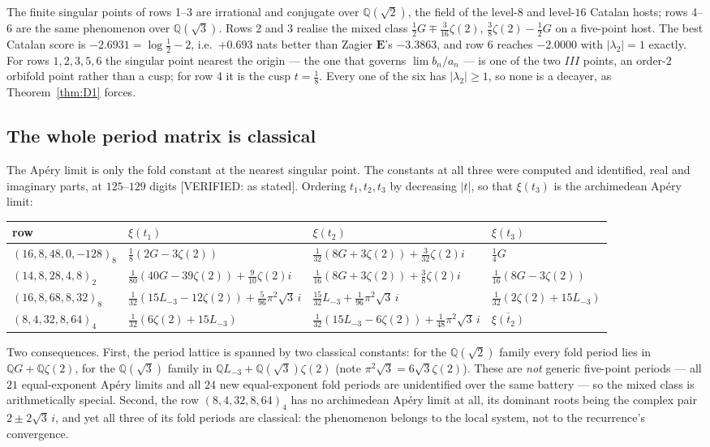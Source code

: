 \documentclass[11pt,reqno]{amsart}
\theoremstyle{plain}
\theoremstyle{definition}
\theoremstyle{remark}
\theoremstyle{plain}
\newcommand{\Q}{\mathbb{Q}}
\newcommand{\Verified}[1]{\textup{\textsf{[VERIFIED: #1]}}}
\begin{document}
The finite singular points of rows 1--3 are irrational and conjugate over
$\Q(\sqrt2)$, the field of the level-$8$ and level-$16$ Catalan hosts; rows 4--6
are the same phenomenon over $\Q(\sqrt3)$. Rows 2 and 3 realise the mixed class
$\tfrac12G\mp\tfrac3{16}\zeta(2)$, $\tfrac38\zeta(2)-\tfrac12G$ on a five-point
host. The best Catalan score is $-2.6931=\log\tfrac12-2$, i.e.\ $+0.693$ nats
better than Zagier $\mathbf E$'s $-3.3863$, and row 6 reaches $-2.0000$ with
$|\lambda_2|=1$ exactly. For rows $1,2,3,5,6$ the singular point nearest the
origin --- the one that governs $\lim b_n/a_n$ --- is one of the two $III$
points, an order-$2$ orbifold point rather than a cusp; for row 4 it is the cusp
$t=\tfrac18$. Every one of the six has $|\lambda_2|\ge1$, so none is a decayer,
as Theorem~\ref{thm:D1} forces.

\subsection{The whole period matrix is classical}\label{sec:matrix}
The Ap\'ery limit is only the fold constant at the nearest singular point. The
constants at all three were computed and identified, real and imaginary parts,
at $125$--$129$ digits \Verified{as stated}. Ordering $t_1,t_2,t_3$ by
decreasing $|t|$, so that $\xi(t_3)$ is the archimedean Ap\'ery limit:

\begin{center}\footnotesize
\begin{tabular}{llll}
\toprule
row & $\xi(t_1)$ & $\xi(t_2)$ & $\xi(t_3)$\\
\midrule
$(16,8,48,0,-128)_{8}$ & $\tfrac18(2G-3\zeta(2))$ & $\tfrac1{32}(8G+3\zeta(2))+\tfrac3{32}\zeta(2)i$ & $\tfrac14G$\\
$(14,8,28,4,8)_{2}$ & $\tfrac1{80}(40G-39\zeta(2))+\tfrac9{10}\zeta(2)i$ & $\tfrac1{16}(8G+3\zeta(2))+\tfrac38\zeta(2)i$ & $\tfrac1{16}(8G-3\zeta(2))$\\
$(16,8,68,8,32)_{8}$ & $\tfrac1{32}(15L_{-3}-12\zeta(2))+\tfrac5{96}\pi^2\sqrt3\,i$ & $\tfrac{15}{32}L_{-3}+\tfrac1{96}\pi^2\sqrt3\,i$ & $\tfrac1{32}(2\zeta(2)+15L_{-3})$\\
$(8,4,32,8,64)_{4}$ & $\tfrac1{32}(6\zeta(2)+15L_{-3})$ & $\tfrac1{32}(15L_{-3}-6\zeta(2))+\tfrac1{48}\pi^2\sqrt3\,i$ & $\overline{\xi(t_2)}$\\
\bottomrule
\end{tabular}
\end{center}

Two consequences. First, the period lattice is spanned by two classical
constants: for the $\Q(\sqrt2)$ family every fold period lies in
$\Q G+\Q\zeta(2)$, for the $\Q(\sqrt3)$ family in $\Q L_{-3}+\Q(\sqrt3)\zeta(2)$
(note $\pi^2\sqrt3=6\sqrt3\zeta(2)$). These are \emph{not} generic five-point
periods --- all $21$ equal-exponent Ap\'ery limits and all $24$ new
equal-exponent fold periods are unidentified over the same battery --- so the
mixed class is arithmetically special. Second, the row $(8,4,32,8,64)_{4}$ has no
archimedean Ap\'ery limit at all, its dominant roots being the complex pair
$2\pm2\sqrt3\,i$, and yet all three of its fold periods are classical: the
phenomenon belongs to the local system, not to the recurrence's convergence.
\end{document}
